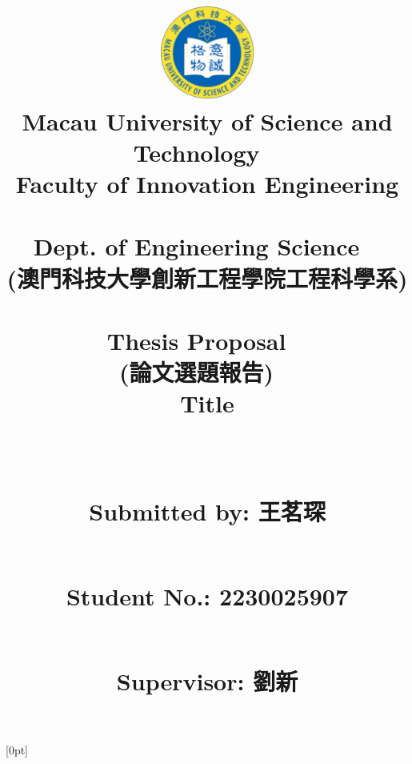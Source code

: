 \documentclass{article}
\begin{document}
\title{\includegraphics[width=1.2in]{MUST.png}\\[-2pt]\huge Macau University of Science and Technology
~\\
Faculty of Innovation Engineering
~\\
Dept. of Engineering Science
~\\
\LARGE{(澳門科技大學創新工程學院工程科學系)}
~\\[40pt]

Thesis Proposal 
~\\
(論文選題報告)
~\\[40pt]

\textbf{\LARGE Title}

\title{}

~\\[50pt]





\large{

 Submitted by: 王茗琛 

~\\[1pt]

 Student No.: 2230025907 

~\\[1pt]

 Supervisor: 劉新} 
 
     } 

\author{}

\date{}


[0pt]{\addvspace{5pt}\filright}              
{\contentspush{\thecontentslabel\ 
}}              
{}{\contentspage}


\maketitle
\thispagestyle{empty}

\clearpage
\end{document}
